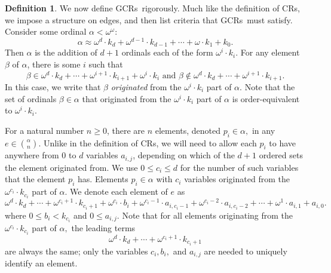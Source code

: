 \documentclass[11pt]{article}
\newcommand{\om}{\omega}
\newcommand{\oequiv}{\approx}
\newcommand{\crulenospace}{CR}
\newcommand{\crulesnospace}{\crulenospace s}
\newcommand{\gencrulenospace}{GCR}
\newcommand{\gencrules}{\gencrulenospace s~}
\newcommand{\numpoints}{n}
\newcommand{\inumpoints}{i}
\newcommand{\idegr}{j}
\newcommand{\commonconst}{a}
\newcommand{\rareconst}{b}
\theoremstyle{plain}
\theoremstyle{definition}
\newtheorem{definition}[theorem]{Definition}
\begin{document}
\begin{definition}
\label{def:SC} We now define \gencrules rigorously. Much like the definition of \crulesnospace, we impose a structure on edges, and then list criteria that \gencrules must satisfy.
Consider some ordinal $\alpha < \om^\om$:
$$\alpha \oequiv \om^d \cdot k_d + \om^{d-1}\cdot k_{d-1} + \cdots + \om \cdot k_1 + k_0.$$
Then $\alpha$ is the addition of $d+1$ ordinals each of the form $\om^\inumpoints\cdot k_\inumpoints$. 
For any element $\beta$ of $\alpha$, there is some $\inumpoints$ such that $$
\beta \in  \om^d \cdot k_d + \cdots + \om^{\inumpoints+1} \cdot k_{\inumpoints+1} + \om^{\inumpoints} \cdot k_{\inumpoints} \text{ and } \beta \not \in \om^d \cdot k_d + \cdots + \om^{\inumpoints+1} \cdot k_{\inumpoints+1}.
$$
In this case, we write that
$\beta$ {\it originated} from the $\om^{\inumpoints} \cdot k_{\inumpoints}$ part of $\alpha$. Note that the set of ordinals $\beta \in \alpha$ that originated from the $\om^{\inumpoints} \cdot k_{\inumpoints}$ part of $\alpha$ is order-equivalent to $\om^{\inumpoints} \cdot k_{\inumpoints}.$

For a natural number
$\numpoints\geq 0$, there are $\numpoints$ elements, denoted $p_\inumpoints \in \alpha,$
in any
$e \in \binom{\alpha}{\numpoints}$. Unlike in the definition of \crulesnospace, we will need to allow each $p_i$ to
have anywhere from 0 to $d$ variables $\commonconst_{\inumpoints,\idegr}$, depending on which of the $d+1$ ordered sets the element originated from. We use
$0 \leq c_{\inumpoints} \leq d$ for the 
number of such variables that the element $p_\inumpoints$ has.
Elements $p_\inumpoints \in \alpha$ with $c_{\inumpoints}$ variables
originated from the $\om^{c_{\inumpoints}} \cdot k_{c_{\inumpoints}}$ part of $\alpha$. We denote each element of $e$ as 
$$
\om^d \cdot k_d + \cdots + \om^{c_{\inumpoints}+1} \cdot k_{c_{\inumpoints}+1} + \om^{c_{\inumpoints}} \cdot \rareconst_{\inumpoints} + \om^{c_{\inumpoints}-1} \cdot \commonconst_{\inumpoints,c_{\inumpoints}-1} + \om^{c_{\inumpoints}-2} \cdot \commonconst_{\inumpoints,c_{\inumpoints}-2} + \cdots + \om^1 \cdot \commonconst_{\inumpoints,1} + \commonconst_{\inumpoints,0}.$$ where $0 \leq \rareconst_{\inumpoints} < k_{c_{\inumpoints}}$ and $0\leq \commonconst_{\inumpoints,\idegr}$. Note that for all elements originating from the $\om^{c_{\inumpoints}} \cdot k_{c_{\inumpoints}}$ part of $\alpha,$ the leading terms $$\om^d \cdot k_d + \cdots + \om^{c_{\inumpoints}+1} \cdot k_{c_{\inumpoints}+1}$$ are always the same; only the variables $c_{\inumpoints}, \rareconst_{\inumpoints},$ and $\commonconst_{\inumpoints,\idegr}$ are needed to uniquely identify an element.


\end{definition}
\end{document}

